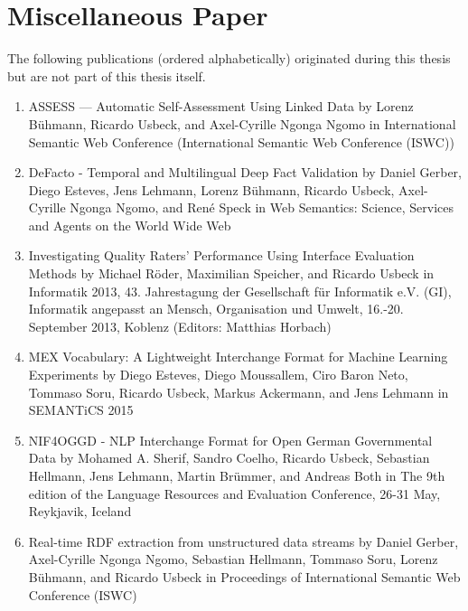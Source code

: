 \section*{Miscellaneous Paper}
The following publications (ordered alphabetically) originated during this thesis but are not part of this thesis itself. 
\begin{enumerate}
    \item ASSESS --- Automatic Self-Assessment Using Linked Data by Lorenz Bühmann, Ricardo Usbeck, and Axel-Cyrille Ngonga Ngomo in International Semantic Web Conference (International Semantic Web Conference (ISWC)) 
    \item DeFacto - Temporal and Multilingual Deep Fact Validation by Daniel Gerber, Diego Esteves, Jens Lehmann, Lorenz Bühmann, Ricardo Usbeck, Axel-Cyrille Ngonga Ngomo, and René Speck in Web Semantics: Science, Services and Agents on the World Wide Web 
    \item Investigating Quality Raters' Performance Using Interface Evaluation Methods by Michael Röder, Maximilian Speicher, and Ricardo Usbeck in Informatik 2013, 43. Jahrestagung der Gesellschaft für Informatik e.V. (GI), Informatik angepasst an Mensch, Organisation und Umwelt, 16.-20. September 2013, Koblenz (Editors: Matthias Horbach) 
    \item MEX Vocabulary: A Lightweight Interchange Format for Machine Learning Experiments by Diego Esteves, Diego Moussallem, Ciro Baron Neto, Tommaso Soru, Ricardo Usbeck, Markus Ackermann, and Jens Lehmann in SEMANTiCS 2015  
    \item NIF4OGGD - NLP Interchange Format for Open German Governmental Data by Mohamed A. Sherif, Sandro Coelho, Ricardo Usbeck, Sebastian Hellmann, Jens Lehmann, Martin Brümmer, and Andreas Both in The 9th edition of the Language Resources and Evaluation Conference, 26-31 May, Reykjavik, Iceland  
    \item Real-time RDF extraction from unstructured data streams by Daniel Gerber, Axel-Cyrille Ngonga Ngomo, Sebastian Hellmann, Tommaso Soru, Lorenz Bühmann, and Ricardo Usbeck in Proceedings of International Semantic Web Conference (ISWC) 
\end{enumerate}